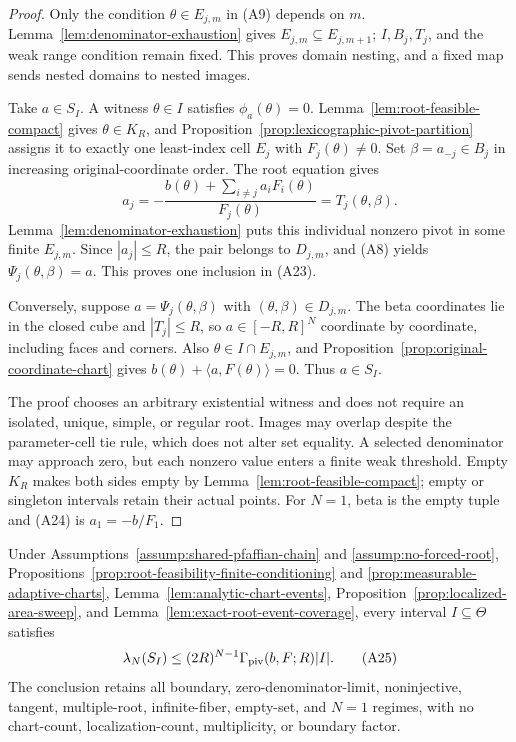 \begin{proof}
Only the condition $\theta\in E_{j,m}$ in \textup{(A9)} depends on $m$.
Lemma~\ref{lem:denominator-exhaustion} gives
$E_{j,m}\subseteq E_{j,m+1}$; $I,B_j,T_j$, and the weak range condition
remain fixed.  This proves domain nesting, and a fixed map sends nested
domains to nested images.

Take $a\in S_I$.  A witness $\theta\in I$ satisfies $\phi_a(\theta)=0$.
Lemma~\ref{lem:root-feasible-compact} gives $\theta\in K_R$, and
Proposition~\ref{prop:lexicographic-pivot-partition} assigns it to exactly
one least-index cell $E_j$ with $F_j(\theta)\neq0$.  Set
$\beta=a_{-j}\in B_j$ in increasing original-coordinate order.  The root
equation gives
\[
a_j=-\frac{b(\theta)+\sum_{i\neq j}a_iF_i(\theta)}{F_j(\theta)}
=T_j(\theta,\beta).
\tag{A24}
\]
Lemma~\ref{lem:denominator-exhaustion} puts this individual nonzero pivot in
some finite $E_{j,m}$.  Since $|a_j|\leq R$, the pair belongs to
$D_{j,m}$, and \textup{(A8)} yields $\Psi_j(\theta,\beta)=a$.  This proves
one inclusion in \textup{(A23)}.

Conversely, suppose $a=\Psi_j(\theta,\beta)$ with
$(\theta,\beta)\in D_{j,m}$.  The beta coordinates lie in the closed cube
and $|T_j|\leq R$, so $a\in[-R,R]^N$ coordinate by coordinate, including
faces and corners.  Also $\theta\in I\cap E_{j,m}$, and
Proposition~\ref{prop:original-coordinate-chart} gives
$b(\theta)+\langle a,F(\theta)\rangle=0$.  Thus $a\in S_I$.

The proof chooses an arbitrary existential witness and does not require an
isolated, unique, simple, or regular root.  Images may overlap despite the
parameter-cell tie rule, which does not alter set equality.  A selected
denominator may approach zero, but each nonzero value enters a finite weak
threshold.  Empty $K_R$ makes both sides empty by
Lemma~\ref{lem:root-feasible-compact}; empty or singleton intervals retain
their actual points.  For $N=1$, beta is the empty tuple and
\textup{(A24)} is $a_1=-b/F_1$.
\end{proof}

\begin{proposition}
\label{prop:root-event-volume}
Under Assumptions~\ref{assump:shared-pfaffian-chain} and
\ref{assump:no-forced-root}, Propositions~\ref{prop:root-feasibility-finite-conditioning}
and \ref{prop:measurable-adaptive-charts},
Lemma~\ref{lem:analytic-chart-events},
Proposition~\ref{prop:localized-area-sweep}, and
Lemma~\ref{lem:exact-root-event-coverage}, every interval
$I\subseteq\Theta$ satisfies
\[
\lambda_N(S_I)
\leq(2R)^{N-1}\Gamma_{\rm piv}(b,F;R)|I|.
\tag{A25}
\]
The conclusion retains all boundary, zero-denominator-limit, noninjective,
tangent, multiple-root, infinite-fiber, empty-set, and $N=1$ regimes, with
no chart-count, localization-count, multiplicity, or boundary factor.
\end{proposition}

